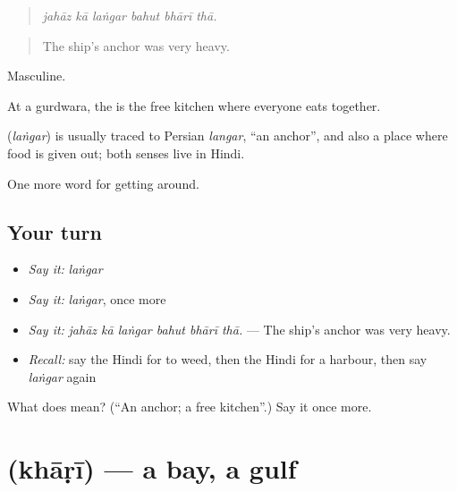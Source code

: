 \begin{quote}
     
\end{quote}

\begin{quote}
\emph{jahāz kā laṅgar bahut bhārī thā.}
\end{quote}

\begin{quote}
The ship's anchor was very heavy.
\end{quote}

Masculine.

At a gurdwara, the  is the free kitchen where everyone eats together.

\begin{cousinweb}
\textbf{} (\emph{laṅgar}) is usually traced to Persian \emph{langar}, \textquotedblleft{}an anchor\textquotedblright{}, and also a place where food is given out; both senses live in Hindi.
\end{cousinweb}

\begin{grammarlens}[title={What you've built}]
One more word for getting around.
\end{grammarlens}

\subsection*{Your turn}
\begin{itemize}
\raggedright
  \item \emph{Say it:} \emph{laṅgar}
  \item \emph{Say it:} \emph{laṅgar}, once more
  \item \emph{Say it:} \emph{jahāz kā laṅgar bahut bhārī thā.} — The ship's anchor was very heavy.
  \item \emph{Recall:} say the Hindi for to weed, then the Hindi for a harbour, then say \emph{laṅgar} again
\end{itemize}

\begin{tcolorbox}[breakable,colback=teal!4,colframe=teal!35!black,title={Before you move on}]
What does  mean? (\textquotedblleft{}An anchor; a free kitchen\textquotedblright{}.) Say it once more.
\end{tcolorbox}
\section[\texorpdfstring{\hi{खाड़ी} (khāṛī)}{खाड़ी (khāṛī)}]{ (khāṛī) — a bay, a gulf}

